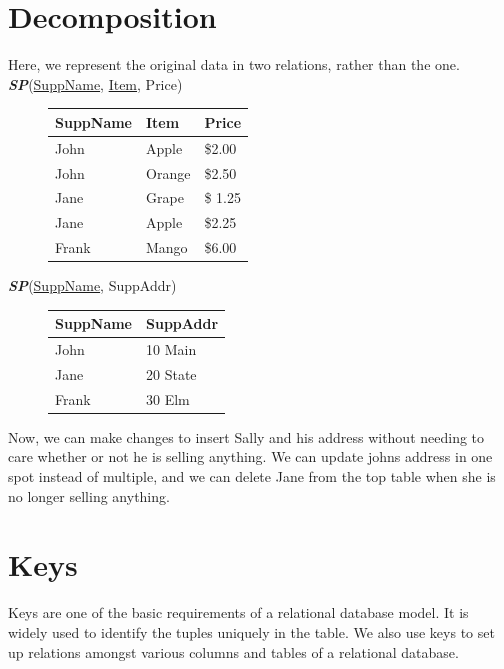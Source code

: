 \documentclass{report}
\begin{document}
          \section{Decomposition}
          Here, we represent the original data in two relations, rather than the one.
          \bigbreak \noindent
      \textit{\textbf{SP}}(\underline{SuppName}, \underline{Item}, Price)
          \begin{figure}[H]
          \centering
           \setlength{\tabcolsep}{30}
          \begin{tabular}{l l l}
              \hline
        SuppName & Item & Price  \\
        \hline
        John&Apple&\$2.00 \\
        John & Orange & \$2.50 \\
        Jane & Grape & \$ 1.25 \\
        Jane & Apple & \$2.25 \\
        Frank & Mango & \$6.00 \\
        \hline
          \end{tabular}
          \end{figure}
     \bigbreak \noindent
     \textit{\textbf{SP}}(\underline{SuppName}, SuppAddr)
    \begin{figure}[H]
    \centering
     \setlength{\tabcolsep}{40}
     
    \begin{tabular}{l l}
        \hline
    SuppName & SuppAddr  \\
\hline
    John & 10 Main \\
    Jane & 20 State \\
    Frank & 30 Elm \\
    \hline
    \end{tabular}
    \end{figure}
    \bigbreak \noindent
   Now, we can make changes to insert Sally and his address without needing to care whether or not he is selling anything. We can update johns address in one spot instead of multiple, and we can delete Jane from the top table when she is no longer selling anything.

    \section{Keys}
    Keys are one of the basic requirements of a relational database model. It is widely used to identify the tuples uniquely in the table. We also use keys to set up relations amongst various columns and tables of a relational database.
\end{document}
